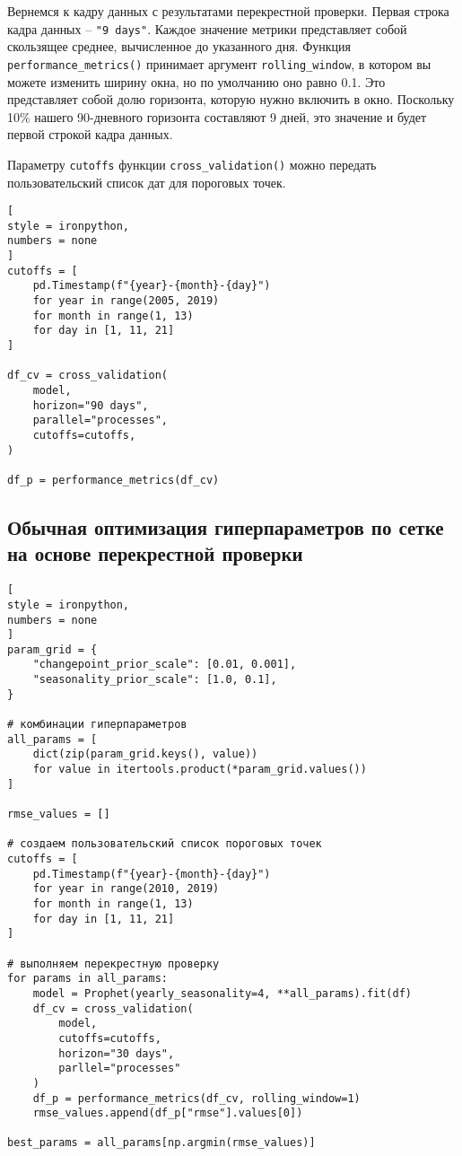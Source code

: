 \documentclass[%
	11pt,
	a4paper,
	utf8,
		]{article}
\begin{document}
Вернемся к кадру данных с результатами перекрестной проверки. Первая строка кадра данных -- \verb|"9 days"|. Каждое значение метрики представляет собой скользящее среднее, вычисленное до указанного дня. Функция \verb|performance_metrics()| принимает аргумент \verb|rolling_window|, в котором вы можете изменить ширину окна, но по умолчанию оно равно 0.1. Это представляет собой долю горизонта, которую нужно включить в окно. Поскольку 10\% нашего 90-дневного горизонта составляют 9 дней, это значение и будет первой строкой кадра данных.

Параметру \verb|cutoffs| функции \verb|cross_validation()| можно передать пользовательский список дат для пороговых точек.
\begin{lstlisting}[
style = ironpython,
numbers = none
]
cutoffs = [
    pd.Timestamp(f"{year}-{month}-{day}")
    for year in range(2005, 2019)
    for month in range(1, 13)
    for day in [1, 11, 21]
]

df_cv = cross_validation(
    model,
    horizon="90 days",
    parallel="processes",
    cutoffs=cutoffs,
)

df_p = performance_metrics(df_cv)
\end{lstlisting}

\subsection{Обычная оптимизация гиперпараметров по сетке на основе перекрестной проверки}

\begin{lstlisting}[
style = ironpython,
numbers = none
]
param_grid = {
    "changepoint_prior_scale": [0.01, 0.001],
    "seasonality_prior_scale": [1.0, 0.1],
}

# комбинации гиперпараметров
all_params = [
    dict(zip(param_grid.keys(), value))
    for value in itertools.product(*param_grid.values())
]

rmse_values = []

# создаем пользовательский список пороговых точек
cutoffs = [
    pd.Timestamp(f"{year}-{month}-{day}")
    for year in range(2010, 2019)
    for month in range(1, 13)
    for day in [1, 11, 21]
]

# выполняем перекрестную проверку
for params in all_params:
    model = Prophet(yearly_seasonality=4, **all_params).fit(df)
    df_cv = cross_validation(
        model,
        cutoffs=cutoffs,
        horizon="30 days",
        parllel="processes"
    )
    df_p = performance_metrics(df_cv, rolling_window=1)
    rmse_values.append(df_p["rmse"].values[0])
    
best_params = all_params[np.argmin(rmse_values)]
\end{lstlisting}
\end{document}
